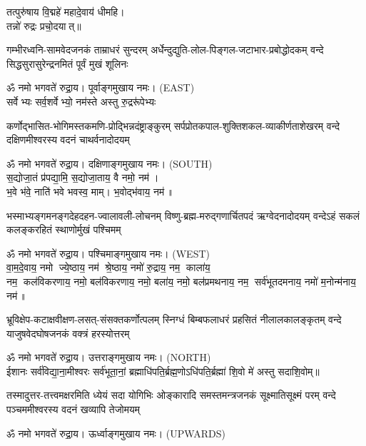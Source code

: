 {\small \closesection}

\begin{center}
तत्पुरु॑षाय वि॒द्महे॑ महादे॒वाय॑ धीमहि।\\
तन्नो॑ रुद्रः प्रचो॒दयात्॥

{गम्भीरध्वनि-सामवेदजनकं ताम्राधरं सुन्दरम्}
{अर्धेन्दुद्युति-लोल-पिङ्गल-जटाभार-प्रबोद्धोदकम्}
{वन्दे सिद्धसुरासुरेन्द्रनमितं पूर्वं मुखं शूलिनः}

ॐ नमो भगवते॑ रुद्रा॒य। पूर्वाङ्गमुखाय नमः। {\scriptsize (EAST)}\\[1em]

{सर्वेभ्यः सर्व॒शर्वेभ्यो॒ नम॑स्ते अस्तु रु॒द्ररू॑पेभ्यः}

{कर्णोद्भासित-भोगिमस्तकमणि-प्रोद्भिन्नदंष्ट्राङ्कुरम्}
{सर्पप्रोतकपाल-शुक्तिशकल-व्याकीर्णताशेखरम्}
{वन्दे दक्षिणमीश्वरस्य वदनं चाथर्वनादोदयम्}

ॐ नमो भगवते॑ रुद्रा॒य। दक्षिणाङ्गमुखाय नमः। {\scriptsize (SOUTH)}\\[1em]

स॒द्योजा॒तं प्र॑पद्या॒मि॒ स॒द्योजा॒ताय॒ वै नमो॒ नम॑।\\
भ॒वे भ॑वे॒ नाति॑ भवे भवस्व॒ माम्। भ॒वोद्भ॑वाय॒ नम॑॥ 

{भस्माभ्यङ्गमनङ्गदेहदहन-ज्वालावली-लोचनम्}
{विष्णु-ब्रह्म-मरुद्गणार्चितपदं ऋग्वेदनादोदयम्}
{वन्देऽहं सकलं कलङ्करहितं स्थाणोर्मुखं पश्चिमम्}

ॐ नमो भगवते॑ रुद्रा॒य। पश्चिमाङ्गमुखाय नमः। {\scriptsize (WEST)}\\[1em]

वा॒म॒दे॒वाय॒ नमो ज्ये॒ष्ठाय॒ नम॑ श्रे॒ष्ठाय॒ नमो॑ रु॒द्राय॒ नम॒ काला॑य॒\\ नम॒ कल॑विकरणाय॒ नमो॒ बल॑विकरणाय॒ नमो॒ बला॑य॒ नमो॒ बल॑प्रमथनाय॒ नम॒ सर्व॑भूतदमनाय॒ नमो॑ म॒नोन्म॑नाय॒ नम॑॥

{भ्रूविक्षेप-कटाक्षवीक्षण-लसत्-संसक्तकर्णोत्पलम्}
{स्निग्धं बिम्बफलाधरं प्रहसितं नीलालकालङ्कृतम्}
{वन्दे याजुषवेदघोषजनकं वक्त्रं हरस्योत्तरम्}

ॐ नमो भगवते॑ रुद्रा॒य। उत्तराङ्गमुखाय नमः। {\scriptsize (NORTH)}\\[1em]

ईशानः सर्व॑विद्या॒ना॒मीश्वरः सर्व॑भूता॒नां॒ ब्रह्माधि॑पति॒र्ब्रह्म॒णोऽधि॑पति॒र्ब्रह्मा॑ शि॒वो मे॑ अस्तु सदाशि॒वोम्॥

{तस्मादुत्तर-तत्त्वमक्षरमिति ध्येयं सदा योगिभिः}
{ओङ्कारादि समस्तमन्त्रजनकं सूक्ष्मातिसूक्ष्मं परम्}
{वन्दे पञ्चममीश्वरस्य वदनं खव्यापि तेजोमयम्}

ॐ नमो भगवते॑ रुद्रा॒य। ऊर्ध्वाङ्गमुखाय नमः। {\scriptsize (UPWARDS)}\\[1em]

\end{center}

